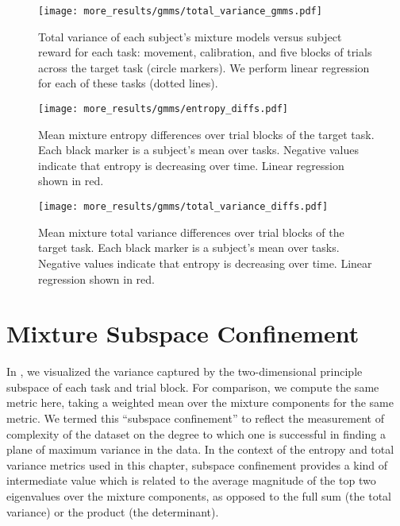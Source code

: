 \documentclass[../main.tex]{subfiles}
\begin{document}
\begin{figure}[!htb]
  \centering
    \texttt{[image: more\_results/gmms/total\_variance\_gmms.pdf]}
    \caption[Mixture total variance versus mean reward]{Total variance of each subject's mixture models versus subject reward for each task: movement, calibration, and five blocks of trials across the target task (circle markers). We perform linear regression for each of these tasks (dotted lines).}\label{fig:gmm_variance_vs_reward}
\end{figure}

\begin{figure}[!htb]
  \centering
    \texttt{[image: more\_results/gmms/entropy\_diffs.pdf]}
    \caption[Mean mixture entropy differences over target task blocks]{Mean mixture entropy differences over trial blocks of the target task. Each black marker is a subject's mean over tasks. Negative values indicate that entropy is decreasing over time. Linear regression shown in red.}\label{fig:gmm_entropy_diffs}
\end{figure}

\begin{figure}[!htb]
  \centering
    \texttt{[image: more\_results/gmms/total\_variance\_diffs.pdf]}
    \caption[Mean mixture total variance differences over target task blocks]{Mean mixture total variance differences over trial blocks of the target task. Each black marker is a subject's mean over tasks. Negative values indicate that entropy is decreasing over time. Linear regression shown in red.}\label{fig:gmm_variance_diffs}
\end{figure}











\section{Mixture Subspace Confinement}

In , we visualized the variance captured by the two-dimensional principle subspace of each task and trial block. For comparison, we compute the same metric here, taking a weighted mean over the mixture components for the same metric. We termed this ``subspace confinement'' to reflect the measurement of complexity of the dataset on the degree to which one is successful in finding a plane of maximum variance in the data. In the context of the entropy and total variance metrics used in this chapter, subspace confinement provides a kind of intermediate value which is related to the average magnitude of the top two eigenvalues over the mixture components, as opposed to the full sum (the total variance) or the product (the determinant). 
\end{document}
